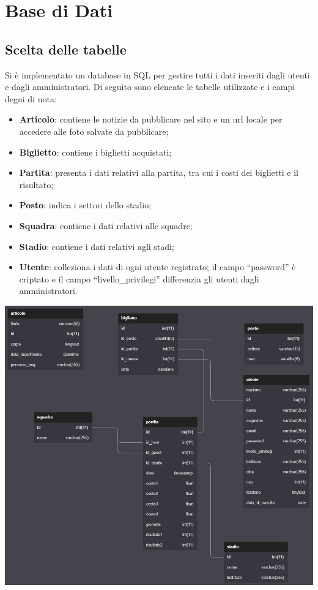 \section{Base di Dati}
    \subsection{Scelta delle tabelle}

    Si è implementato un database in SQL per gestire tutti i dati inseriti dagli utenti e dagli amministratori.
    Di seguito sono elencate le tabelle utilizzate e i campi degni di nota:
    \begin{itemize}
        \item \textbf{ Articolo}: contiene le notizie da pubblicare nel sito e un url locale per accedere alle foto salvate da pubblicare;
        \item \textbf{ Biglietto}: contiene i biglietti acquistati;
        \item \textbf{ Partita}: presenta i dati relativi alla partita, tra cui i costi dei biglietti e il risultato;
        \item \textbf{ Posto}: indica i settori dello stadio;
        \item \textbf{ Squadra}: contiene i dati relativi alle squadre;
        \item \textbf{ Stadio}: contiene i dati relativi agli stadi;
        \item \textbf{ Utente}: colleziona i dati di ogni utente registrato; il campo “password” è criptato e il campo “livello\_privilegi” differenzia gli utenti dagli amministratori.
    \end{itemize}
    
    \begin{center}
        \includegraphics[scale=0.5]{images/database.png}
    \end{center}
    
